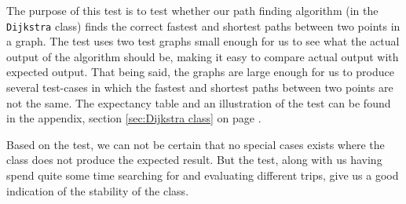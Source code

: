 The purpose of this test is to test whether our path finding algorithm (in the \texttt{Dijkstra} class) finds the correct fastest and shortest paths between two points in a graph. The test uses two test graphs small enough for us to see what the actual output of the algorithm should be, making it easy to compare actual output with expected output. That being said, the graphs are large enough for us to produce several test-cases in which the fastest and shortest paths between two points are not the same. The expectancy table and an illustration of the test can be found in the appendix, section \ref{sec:Dijkstra class} on page \pageref{sec:Dijkstra class}.

Based on the test, we can not be certain that no special cases exists where the class does not produce the expected result. But the test, along with us having spend quite some time searching for and evaluating different trips, give us a good indication of the stability of the class.